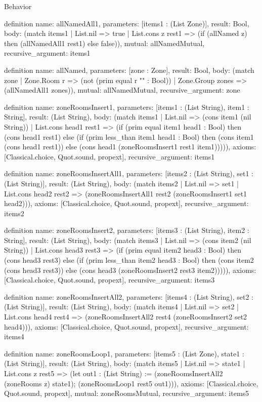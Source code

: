 \begin{lexlean}{Behavior}
\begin{semanticmodule}
definition{
  name: allNamedAll1,
  parameters: [items1 : (List Zone)],
  result: Bool,
  body: (match items1
    | List.nil => true
    | List.cons z rest1 => (if (allNamed z) then (allNamedAll1 rest1) else false)),
  mutual: allNamedMutual,
  recursive_argument: items1
}

definition{
  name: allNamed,
  parameters: [zone : Zone],
  result: Bool,
  body: (match zone
    | Zone.Room r => (not (prim equal r "" : Bool))
    | Zone.Group zones => (allNamedAll1 zones)),
  mutual: allNamedMutual,
  recursive_argument: zone
}

definition{
  name: zoneRoomsInsert1,
  parameters: [items1 : (List String), item1 : String],
  result: (List String),
  body: (match items1
    | List.nil => (cons item1 (nil String))
    | List.cons head1 rest1 => (if (prim equal item1 head1 : Bool) then (cons head1 rest1) else (if (prim less_than item1 head1 : Bool) then (cons item1 (cons head1 rest1)) else (cons head1 (zoneRoomsInsert1 rest1 item1))))),
  axioms: [Classical.choice, Quot.sound, propext],
  recursive_argument: items1
}

definition{
  name: zoneRoomsInsertAll1,
  parameters: [items2 : (List String), set1 : (List String)],
  result: (List String),
  body: (match items2
    | List.nil => set1
    | List.cons head2 rest2 => (zoneRoomsInsertAll1 rest2 (zoneRoomsInsert1 set1 head2))),
  axioms: [Classical.choice, Quot.sound, propext],
  recursive_argument: items2
}

definition{
  name: zoneRoomsInsert2,
  parameters: [items3 : (List String), item2 : String],
  result: (List String),
  body: (match items3
    | List.nil => (cons item2 (nil String))
    | List.cons head3 rest3 => (if (prim equal item2 head3 : Bool) then (cons head3 rest3) else (if (prim less_than item2 head3 : Bool) then (cons item2 (cons head3 rest3)) else (cons head3 (zoneRoomsInsert2 rest3 item2))))),
  axioms: [Classical.choice, Quot.sound, propext],
  recursive_argument: items3
}

definition{
  name: zoneRoomsInsertAll2,
  parameters: [items4 : (List String), set2 : (List String)],
  result: (List String),
  body: (match items4
    | List.nil => set2
    | List.cons head4 rest4 => (zoneRoomsInsertAll2 rest4 (zoneRoomsInsert2 set2 head4))),
  axioms: [Classical.choice, Quot.sound, propext],
  recursive_argument: items4
}

definition{
  name: zoneRoomsLoop1,
  parameters: [items5 : (List Zone), state1 : (List String)],
  result: (List String),
  body: (match items5
    | List.nil => state1
    | List.cons z rest5 => (let out1 : (List String) := (zoneRoomsInsertAll2 (zoneRooms z) state1); (zoneRoomsLoop1 rest5 out1))),
  axioms: [Classical.choice, Quot.sound, propext],
  mutual: zoneRoomsMutual,
  recursive_argument: items5
}


\end{semanticmodule}
\end{lexlean}
